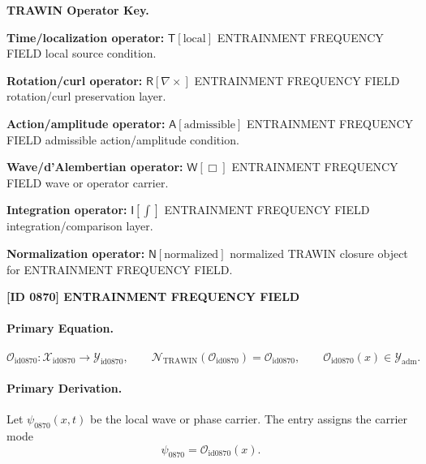 \par\vspace{0.45\baselineskip}
\noindent\begin{minipage}[t]{\linewidth}
\begingroup
\small
\raggedright
\textbf{TRAWIN Operator Key.}\par
\noindent\textbf{Time/localization operator:} $\mathsf{T}\!\left[\mathrm{local}\right]$ ENTRAINMENT FREQUENCY FIELD local source condition.\par
\noindent\textbf{Rotation/curl operator:} $\mathsf{R}\!\left[\nabla\times\right]$ ENTRAINMENT FREQUENCY FIELD rotation/curl preservation layer.\par
\noindent\textbf{Action/amplitude operator:} $\mathsf{A}\!\left[\mathrm{admissible}\right]$ ENTRAINMENT FREQUENCY FIELD admissible action/amplitude condition.\par
\noindent\textbf{Wave/d'Alembertian operator:} $\mathsf{W}\!\left[\Box\right]$ ENTRAINMENT FREQUENCY FIELD wave or operator carrier.\par
\noindent\textbf{Integration operator:} $\mathsf{I}\!\left[\int\right]$ ENTRAINMENT FREQUENCY FIELD integration/comparison layer.\par
\noindent\textbf{Normalization operator:} $\mathsf{N}\!\left[\mathrm{normalized}\right]$ normalized TRAWIN closure object for ENTRAINMENT FREQUENCY FIELD.\par
\endgroup
\end{minipage}

\clearpage
\noindent\textbf{[ID 0870] ENTRAINMENT FREQUENCY FIELD}\par
\vspace{0.35em}
\paragraph{Primary Equation.}
\[
\mathcal{O}_{\mathrm{id0870}}:\mathcal{X}_{\mathrm{id0870}}\longrightarrow \mathcal{Y}_{\mathrm{id0870}},\qquad
\mathcal{N}_{\mathrm{TRAWIN}}(\mathcal{O}_{\mathrm{id0870}})=\mathcal{O}_{\mathrm{id0870}},\qquad
\mathcal{O}_{\mathrm{id0870}}(x)\in\mathcal{Y}_{\mathrm{adm}}.
\]

\paragraph{Primary Derivation.} Let $\psi_{0870}(x,t)$ be the local wave or phase carrier.  The entry assigns the carrier mode\[
\psi_{0870}=\mathcal{O}_{\mathrm{id0870}}(x).
\]

